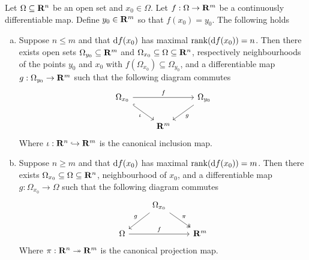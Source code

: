 \begin{theorem}
  \label{thm:maximal-rank-theorem}
  Let \(\Omega \subseteq \mathbf{R}^n\) be an open set and \(x_0 \in \Omega\). Let \(f: \Omega \to \mathbf{R}^m\) be a
  continuously differentiable map. Define \(y_0 \in \mathbf{R}^m\) so that \(f(x_0) =
  y_0\). The following holds
  \begin{enumerate}[(a).]\setlength\itemsep{0em}
    \item Suppose \(n \leq m\) and that \(\mathrm{d} f(x_0)\) has maximal
      \(\operatorname{rank}(\mathrm{d} f(x_{0})) = n\). Then there exists open sets \(\Omega_{y_0} \subseteq
      \mathbf{R}^m\) and \(\Omega_{x_0} \subseteq \Omega \subseteq \mathbf{R}^n\), respectively neighbourhoods of the points
      \(y_0\) and \(x_0\) with \(f(\Omega_{x_0}) \subseteq \Omega_{y_0}\), and a differentiable
      map \(g: \Omega_{y_0} \to \mathbf{R}^m\) such that the following diagram commutes
      \[
        \begin{tikzcd}
          \Omega_{x_{0}} \ar[rr, "f"] \ar[dr, hook, swap, "\iota"]  & &\Omega_{y_0} \ar[dl, "g"] \\
          &\R^m &
        \end{tikzcd}
      \]
      Where \(\iota: \mathbf{R}^n \hookrightarrow \mathbf{R}^m\) is the canonical inclusion map.
    \item Suppose \(n \geq m\) and that \(\mathrm{d} f(x_0)\) has maximal
      \(\operatorname{rank}(\mathrm{d} f(x_0)) = m\). Then there exists \(\Omega_{x_0} \subseteq \Omega \subseteq \mathbf{R}^n\),
      neighbourhood of \(x_0\), and a differentiable map \(g: \Omega_{x_{0}} \to \Omega\)
      such that the following diagram commutes
      \[
        \begin{tikzcd}
          &\Omega_{x_0} \ar[dr, two heads, "\pi"] \ar[ld, swap, "g"] & \\
          \Omega \ar[rr, "f"] & &\R^m
        \end{tikzcd}
      \]
      Where \(\pi: \mathbf{R}^n \twoheadrightarrow \mathbf{R}^m\) is the canonical projection map.
  \end{enumerate}
\end{theorem}

